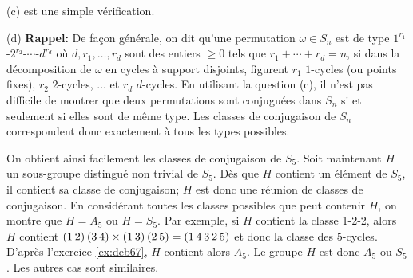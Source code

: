 {{(c) est une simple v\'erification.
\smallskip

(d) {\bf Rappel:} De fa\c con g\'en\'erale, on dit qu'une permutation $\omega \in S_n$ est de
type $1^{r_1}$-$2^{r_2}$-$\cdots$-$d^{r_d}$ o\`u $d, r_1,\ldots,r_d$ sont des entiers $\geq 0$
tels que $r_1+\cdots+r_d=n$, si dans la d\'ecomposition de $\omega$ en cycles \`a support
disjoints, figurent $r_1$ $1$-cycles (ou points fixes), $r_2$ $2$-cycles, ... et $r_d$
$d$-cycles. En utilisant la question (c), il n'est pas difficile de montrer que deux
permutations sont conjugu\'ees dans $S_n$ si et seulement si elles sont de m\^eme type.    
Les classes de conjugaison de $S_n$ correspondent donc exactement \`a tous les types
possibles.

\smallskip
On obtient ainsi facilement les classes de conjugaison de $S_5$. Soit maintenant $H$ un
sous-groupe distingu\'e non trivial de $S_5$. D\`es que $H$ contient un \'el\'ement de $S_5$,
il contient sa classe de conjugaison; $H$ est donc une r\'eunion de classes de conjugaison.
En consid\'erant toutes les classes possibles que peut contenir $H$, on montre que $H=A_5$ ou
$H=S_5$. Par exemple, si $H$ contient la classe 1-2-2, alors $H$ contient $(1\hskip 2pt
2)\hskip 2pt (3\hskip 2pt 4) \times (1\hskip 2pt 3)\hskip 2pt (2\hskip 2pt 5) = (1\hskip 2pt
4\hskip 2pt 3\hskip 2pt 2\hskip 2pt 5)$ et donc la classe des $5$-cycles. D'apr\`es
l'exercice \ref{ex:deb67}, $H$ contient alors $A_5$. Le groupe $H$ est donc $A_5$ ou $S_5$. Les autres cas
sont similaires.}
}
